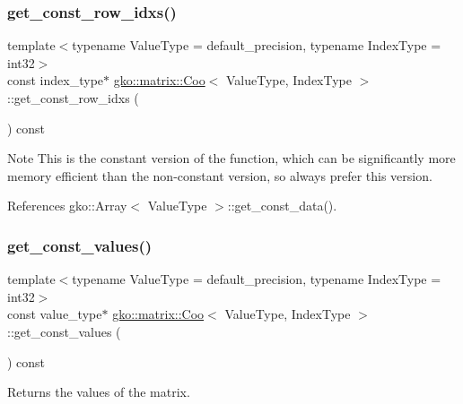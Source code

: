 \subsubsection{\texorpdfstring{get\+\_\+const\+\_\+row\+\_\+idxs()}{get\_const\_row\_idxs()}}
{\footnotesize\ttfamily template$<$typename Value\+Type = default\+\_\+precision, typename Index\+Type = int32$>$ \\
const index\+\_\+type$\ast$ \hyperlink{classgko_1_1matrix_1_1Coo}{gko\+::matrix\+::\+Coo}$<$ Value\+Type, Index\+Type $>$\+::get\+\_\+const\+\_\+row\+\_\+idxs (\begin{DoxyParamCaption}{ }\end{DoxyParamCaption}) const\hspace{0.3cm}{\ttfamily [noexcept]}}





\begin{DoxyNote}{Note}
This is the constant version of the function, which can be significantly more memory efficient than the non-\/constant version, so always prefer this version. 
\end{DoxyNote}


References gko\+::\+Array$<$ Value\+Type $>$\+::get\+\_\+const\+\_\+data().

\mbox{\label{classgko_1_1matrix_1_1Coo_af0f6fe19d81bc4207aad66376f9c87c5}} 
\subsubsection{\texorpdfstring{get\+\_\+const\+\_\+values()}{get\_const\_values()}}
{\footnotesize\ttfamily template$<$typename Value\+Type = default\+\_\+precision, typename Index\+Type = int32$>$ \\
const value\+\_\+type$\ast$ \hyperlink{classgko_1_1matrix_1_1Coo}{gko\+::matrix\+::\+Coo}$<$ Value\+Type, Index\+Type $>$\+::get\+\_\+const\+\_\+values (\begin{DoxyParamCaption}{ }\end{DoxyParamCaption}) const\hspace{0.3cm}{\ttfamily [noexcept]}}



Returns the values of the matrix. 

